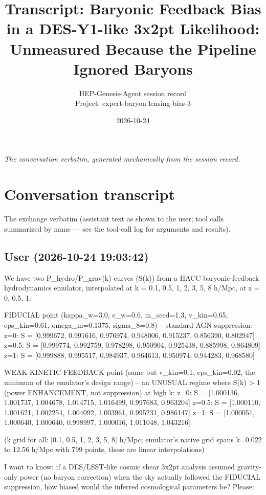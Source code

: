 \documentclass[11pt,a4paper]{article}
\title{Transcript: Baryonic Feedback Bias in a DES-Y1-like 3x2pt Likelihood: Unmeasured Because the Pipeline Ignored Baryons}
\author{HEP-Genesis-Agent session record \\ \small Project: expert-baryon-lensing-bias-3}
\date{2026-10-24}
\begin{document}
\maketitle
\noindent\textit{\small The conversation verbatim, generated mechanically from the session record.}
\vspace{1em}



\appendix
\section{Conversation transcript}
\label{app:transcript}
The exchange verbatim (assistant text as shown to the user; tool calls summarized by name --- see the tool-call log for arguments and results).
\subsection*{User \small(2026-10-24 19:03:42)}
We have two P\_hydro/P\_grav(k) curves (S(k)) from a HACC baryonic-feedback hydrodynamics emulator, interpolated at k = 0.1, 0.5, 1, 2, 3, 5, 8 h/Mpc, at z = 0, 0.5, 1:

FIDUCIAL point (kappa\_w=3.0, e\_w=0.6, m\_seed=1.3, v\_kin=0.65, eps\_kin=0.61, omega\_m=0.1375, sigma\_8=0.8) -- standard AGN suppression: z=0:   S = [0.999672, 0.991616, 0.976974, 0.948006, 0.915237, 0.856390, 0.802947] z=0.5: S = [0.999774, 0.992759, 0.978298, 0.950904, 0.925438, 0.885998, 0.864809] z=1:   S = [0.999888, 0.995517, 0.984937, 0.964613, 0.950974, 0.944283, 0.968580]

WEAK-KINETIC-FEEDBACK point (same but v\_kin=0.1, eps\_kin=0.02, the minimum of the emulator's design range) -- an UNUSUAL regime where S(k) \textgreater{} 1 (power ENHANCEMENT, not suppression) at high k: z=0:   S = [1.000136, 1.001737, 1.004678, 1.014715, 1.016499, 0.997683, 0.963204] z=0.5: S = [1.000110, 1.001621, 1.002254, 1.004092, 1.003961, 0.995231, 0.986147] z=1:   S = [1.000051, 1.000640, 1.000640, 0.998997, 1.000016, 1.011048, 1.043216]

(k grid for all: [0.1, 0.5, 1, 2, 3, 5, 8] h/Mpc; emulator's native grid spans k=0.022 to 12.56 h/Mpc with 799 points, these are linear interpolations)

I want to know: if a DES/LSST-like cosmic shear 3x2pt analysis assumed gravity-only power (no baryon correction) when the sky actually followed the FIDUCIAL suppression, how biased would the inferred cosmological parameters be? Please:
\end{document}

